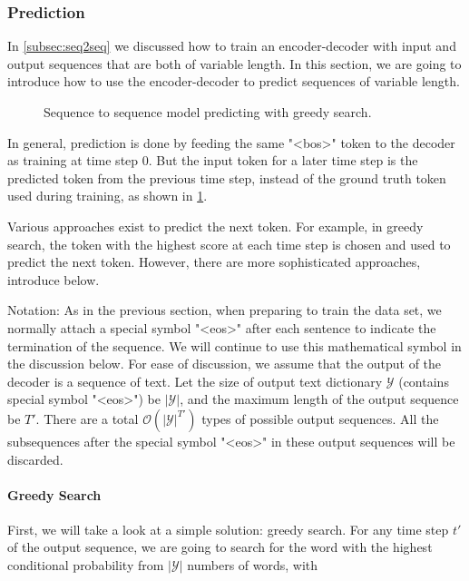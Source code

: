 \subsubsection{Prediction}

In \cref{subsec:seq2seq}  we discussed how to train an encoder-decoder with input and output sequences that are both of variable length. In this section, we are going to introduce how to use the encoder-decoder to predict sequences of variable length.

\begin{figure}[hpt]
	\centering
	
	\caption{Sequence to sequence model predicting with greedy search.}
	\label{fig:seq2seq_predict}
\end{figure}

In general, prediction is done by feeding the same "<bos>" token to the decoder as training at time step 0. But the input token for a later time step is the predicted token from the previous time step, instead of the ground truth token used during training, as shown in \cref{fig:seq2seq_predict}.

Various approaches exist to predict the next token. For example, in greedy search, the token with the highest score at each time step is chosen and used to predict the next token. However, there are more sophisticated approaches, introduce below. 

Notation: As in the previous section, when preparing to train the data set, we normally attach a special symbol "<eos>" after each sentence to indicate the termination of the sequence. We will continue to use this mathematical symbol in the discussion below. For ease of discussion, we assume that the output of the decoder is a sequence of text. Let the size of output text dictionary $\mathcal{Y}$ (contains special symbol "<eos>") be $\left|\mathcal{Y}\right|$, and the maximum length of the output sequence be $T'$. There are a total $\mathcal{O}(\left|\mathcal{Y}\right|^{T'})$ types of possible output sequences. All the subsequences after the special symbol "<eos>" in these output sequences will be discarded.


\paragraph{Greedy Search}
First, we will take a look at a simple solution: greedy search. For any time step $t'$ of the output sequence, we are going to search for the word with the highest conditional probability from $|\mathcal{Y}|$ numbers of words, with

